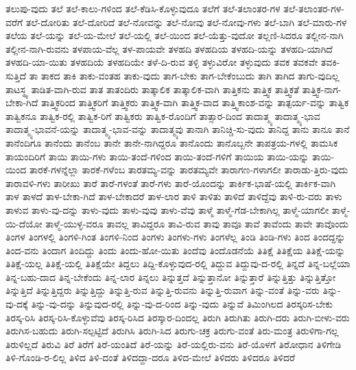 {ತಲುಪು-ವುದು
ತಲೆ
ತಲೆ-ಕಾಲು-ಗಳಿಂದ
ತಲೆ-ಕೆಡಿಸಿ-ಕೊಳ್ಳುವುದೂ
ತಲೆಗೆ
ತಲೆ-ತಲಾಂತರ-ಗಳ
ತಲೆ-ತಲಾಂತರ-ಗಳ-ವರೆಗೆ
ತಲೆ-ದೋರಿತು
ತಲೆ-ದೋರಿದೆ
ತಲೆ-ನೋವನ್ನು
ತಲೆ-ನೋವು
ತಲೆ-ನೋವು-ಗಳು
ತಲೆ-ಬಾಗಿ
ತಲೆ-ಮಾರು-ಗಳ
ತಲೆಯ
ತಲೆ-ಯನ್ನು
ತಲೆ-ಯ-ಮೇಲೆ
ತಲೆ-ಯಲ್ಲಿ
ತಲೆ-ಯಿಂದ
ತಲೆ-ಯೆತ್ತು-ವುದೋ
ತಲ್ಲಣಿ-ಸಿದರೂ
ತಲ್ಲೀನ-ನಾಗಿ
ತಲ್ಲೀನ-ನಾಗಿ-ರುವನು
ತಳಪಾಯ-ವೆಲ್ಲ
ತಳ-ಪಾಯವೇ
ತಳಹದಿ
ತಳಹದಿಯ
ತಳಹದಿ-ಯನ್ನು
ತಳಹದಿ-ಯಾಗಿದೆ
ತಳಹದಿ-ಯಾ-ಯಿತು
ತಳಹದಿಯೆ
ತಳಹದಿಯೇ
ತಳೆ-ದಿ-ರುವ
ತಳ್ಳಿ
ತಳ್ಳುವಿರೋ
ತಳ್ಳುವುದು
ತವಕ
ತವಕವೇ
ತವಕಿ-ಸುತ್ತಿದೆ
ತಾ
ತಾಕದ
ತಾಕಿ
ತಾಕು-ವಂತಹ
ತಾಕು-ವುದು
ತಾಗ-ಬೇಕು
ತಾಗ-ಬೇಕೆಂಬುದು
ತಾಗಿ
ತಾಗಿದ
ತಾಗು-ವುದಿಲ್ಲ
ತಾಟಸ್ಥ್ಯ
ತಾಡಿತ-ವಾಗಿ-ರುವ
ತಾತ
ತಾತಂದಿರು
ತಾತ್ಕಾಲಿಕ
ತಾತ್ಕಾಲಿಕ-ವಾಗಿ
ತಾತ್ತಿಕನು
ತಾತ್ತ್ವಿಕ
ತಾತ್ತ್ವಿಕತೆ
ತಾತ್ತ್ವಿಕ-ನಾಗ-ಬೇಕಾ-ಗಿದೆ
ತಾತ್ತ್ವಿಕರಿಂದ
ತಾತ್ತ್ವಿಕರಿಗೆ
ತಾತ್ತ್ವಿಕರು
ತಾತ್ತ್ವಿಕ-ವಾಗಿ
ತಾತ್ತ್ವಿಕ-ವಾದ
ತಾತ್ತ್ವಿಕಾಂಶ-ವನ್ನು
ತಾತ್ಪರ್ಯ-ವನ್ನು
ತಾತ್ವಿಕ
ತಾತ್ವಿಕನೂ
ತಾತ್ವಿಕ-ರಲ್ಲಿ
ತಾತ್ವಿಕ-ರಿಗೆ
ತಾತ್ವಿಕರು
ತಾತ್ವಿಕ-ರೊಂದಿಗೆ
ತಾತ್ಸಾರ-ದಿಂದ
ತಾದಾತ್ಮ್ಯ
ತಾದಾತ್ಮ್ಯ-ಭಾವ
ತಾದಾತ್ಮ್ಯ-ಭಾವನೆ-ಯನ್ನು
ತಾದಾತ್ಮ್ಯ-ಭಾವ-ವನ್ನು
ತಾದಾತ್ಮ್ಯವು
ತಾನಾಗಿ
ತಾನಿಚ್ಚಿ-ಸು-ವುದು
ತಾನಿದ್ದ
ತಾನು
ತಾನೂ
ತಾನೆ
ತಾನೆಂದಿಗೂ
ತಾನೆಂದು
ತಾನೆಂಬ
ತಾನೇ
ತಾನೇ-ನಾಗಿದ್ದರೂ
ತಾನೊಂದು
ತಾನೊಬ್ಬನೇ
ತಾಪತ್ರಯ-ಗಳಲ್ಲಿ
ತಾಮಸಿಕ
ತಾಯಂದಿರಿಗೆ
ತಾಯಿ
ತಾಯಿ-ಗಳು
ತಾಯಿ-ತಂದೆ-ಗಳಿಂದ
ತಾಯಿ-ತಂದೆ-ಗಳಿಗೆ
ತಾಯಿಯ
ತಾಯಿ-ಯನ್ನು
ತಾಯಿ-ಯಿಂದ
ತಾರಕೆ-ಗಳನ್ನೆಲ್ಲಾ
ತಾರಕೆ-ಗಳೆಂಬ
ತಾರತಮ್ಯ-ವನ್ನು
ತಾರತಮ್ಯವೇ
ತಾರಾಗಣ-ಗಳಾಗಲೀ
ತಾರಾಡು-ತ್ತಿರು-ವುದು
ತಾರಾವಳಿ-ಗಳು
ತಾರೀಖು
ತಾರೆ
ತಾರೆ-ಗಳಂತೆ
ತಾರೆ-ಗಳು
ತಾರೆ-ಯೊಂದನ್ನು
ತಾರ್ಕಿಕ-ಭಾಷೆ-ಯಲ್ಲಿ
ತಾರ್ಕಿಕ-ವಾಗಿ
ತಾಳ
ತಾಳದೆ
ತಾಳ-ಬೇಕಾ-ಗಿದೆ
ತಾಳ-ಬೇಕಾದರೆ
ತಾಳ-ಲಾರ
ತಾಳಿ
ತಾಳಿತು
ತಾಳಿದೆ
ತಾಳಿದ್ದೆವು
ತಾಳಿ-ರು-ವರು
ತಾಳು
ತಾಳುವ
ತಾಳು-ವು-ದನ್ನು
ತಾಳು-ವುದು
ತಾಳು-ವುವು
ತಾಳು-ವೆವು
ತಾಳ್ಮೆ
ತಾಳ್ಮೆ-ಗೆಡ-ಬೇಕಾಗಿಲ್ಲ
ತಾಳ್ಮೆ-ಯಾಗಲೀ
ತಾಳ್ಮೆ-ಯಿ-ದೆಯೋ
ತಾಳ್ಮೆ-ಯುಳ್ಳ-ವರೂ
ತಾವಲ್ಲ
ತಾವಿದ್ದರೂ
ತಾವಿ-ರುವ
ತಾವು
ತಾವೂ
ತಾವೆ
ತಾವೆಂದು
ತಾವೇ
ತಾವೊಂದು
ತಿಂಗಳ
ತಿಂಗಳಲ್ಲಿ
ತಿಂಗಳಿ-ಗಿಂತ
ತಿಂಗಳಿ-ನಿಂದ
ತಿಂಗಳು
ತಿಂಗಳು-ಗಳು
ತಿಂಗಳೆಲ್ಲ
ತಿಂಡಿ
ತಿಂಡಿ-ಗಳು
ತಿಂದ
ತಿಂದದ್ದನ್ನು
ತಿಂದ-ವನು
ತಿಂದಾಗ
ತಿಂದಿದ್ದು
ತಿಂದು
ತಿಂದು-ಹೋ-ಯಿತು
ತಿಂದೆವು
ತಿಂದೊಡನೆಯೆ
ತಿತಿಕ್ಷೆ
ತಿತಿಕ್ಷೆಯ
ತಿತಿಕ್ಷೆ-ಯನ್ನು
ತಿತಿಕ್ಷೆ-ಯಲ್ಲ
ತಿತಿಕ್ಷೆ-ಯಲ್ಲಿ
ತಿತಿಕ್ಷೆಯೇ
ತಿದ್ದಲು
ತಿದ್ದಿ-ಕೊಳ್ಳುವುದ-ರಲ್ಲಿ
ತಿದ್ದುವ
ತಿದ್ದುವು-ದ-ರಲ್ಲಿ
ತಿನ್ನದೆ
ತಿನ್ನ-ಬಲ್ಲೆಯಾ
ತಿನ್ನ-ಬಹು-ದಾದ
ತಿನ್ನ-ಬೇಕೆಂದು
ತಿನ್ನ-ಲಾರ
ತಿನ್ನಲು
ತಿನ್ನುತ್ತದೆ
ತಿನ್ನುತ್ತಾನೋ
ತಿನ್ನುತ್ತಾರೆ
ತಿನ್ನುತ್ತಿತ್ತು
ತಿನ್ನುತ್ತಿತ್ತೋ
ತಿನ್ನುತ್ತಿದೆ
ತಿನ್ನುತ್ತಿದ್ದರು
ತಿನ್ನುತ್ತಿದ್ದು
ತಿನ್ನುತ್ತಿ-ರುವ
ತಿನ್ನುತ್ತಿ-ರುವನು
ತಿನ್ನುತ್ತಿ-ರುವಾಗ
ತಿನ್ನು-ವಂತೆ
ತಿನ್ನು-ವರು
ತಿನ್ನು-ವು-ದಕ್ಕೆ
ತಿನ್ನು-ವು-ದನ್ನು
ತಿನ್ನುವುದ-ರಲ್ಲಿ
ತಿನ್ನು-ವು-ದ-ರಿಂದ
ತಿನ್ನು-ವುದು
ತಿನ್ನುವೆ
ತಿಮಿಂಗಿಲದ
ತಿರಸ್ಕರಿಸ-ಬೇಕು
ತಿರಸ್ಕ-ರಿಸಿ
ತಿರಸ್ಕ-ರಿಸಿ-ಕೊಳ್ಳುವೆವು
ತಿರಸ್ಕ-ರಿಸಿದ
ತಿರಸ್ಕಾರ-ದಿಂದಲ್ಲ
ತಿರುಗಿ
ತಿರುಗಿತು
ತಿರುಗಿ-ದರು
ತಿರುಗಿ-ಬೀಳು-ವರು
ತಿರುಗಿಸ-ಬಹುದು
ತಿರುಗಿ-ಸಲ್ಪಟ್ಟಿದೆ
ತಿರುಗಿಸಿ
ತಿರುಗಿ-ಸಿದ
ತಿರುಗು-ಚಕ್ರ
ತಿರುಗು-ವಂತೆ
ತಿರು-ಮಂತ್ರ
ತಿರುಳಿಗಾ-ಗಲ್ಲ
ತಿರುಳಿಲ್ಲದೆ
ತಿರುವಿ
ತಿರೆ
ತಿರೆಗೆ
ತಿರೆ-ಯಂತಿದೆ
ತಿರೆ-ಯನ್ನು
ತಿರೆ-ಯಲ್ಲಿರು-ವನು
ತಿರೆ-ಯೊಳಗೆ
ತಿರೋಧಾನ
ತಿಳಿಗೇಡಿ
ತಿಳಿ-ಗೊಂಡಿ-ರ-ಲಿಲ್ಲ
ತಿಳಿದ
ತಿಳಿ-ದಂತೆ
ತಿಳಿದದ್ದಾ-ದರೂ
ತಿಳಿದ-ಮೇಲೆ
ತಿಳಿದರು
ತಿಳಿದರೂ
ತಿಳಿದರೆ
}
